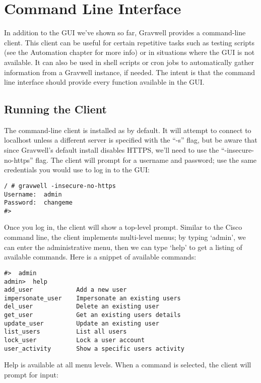 \chapter{Command Line Interface}
In addition to the GUI we've shown so far, Gravwell provides a
command-line client. This client can be useful for certain repetitive
tasks such as testing scripts (see the Automation chapter for more info)
or in situations where the GUI is not available. It can also be used in
shell scripts or cron jobs to automatically gather information from a
Gravwell instance, if needed. The intent is that the command line
interface should provide every function available in the GUI.

\section{Running the Client}

The command-line client is installed as  by
default. It will attempt to connect to localhost unless a different
server is specified with the ``-s'' flag, but be aware that since Gravwell's
default install disables HTTPS, we'll need to use the ``-insecure-no-https''
flag. The client will prompt for a username and password; use the same
credentials you would use to log in to the GUI:

\begin{Verbatim}[breaklines=true]
/ # gravwell -insecure-no-https
Username:  admin
Password:  changeme
#>
\end{Verbatim}

Once you log in, the client will show a top-level prompt. Similar to
the Cisco command line, the client implements multi-level menus; by
typing `admin', we can enter the administrative menu, then we can type
`help' to get a listing of available commands. Here is a snippet of
available commands:

\begin{Verbatim}[breaklines=true]
#>  admin
admin>  help
add_user            Add a new user
impersonate_user    Impersonate an existing users
del_user            Delete an existing user
get_user            Get an existing users details
update_user         Update an existing user
list_users          List all users
lock_user           Lock a user account
user_activity       Show a specific users activity
\end{Verbatim}

Help is available at all menu levels. When a command is selected,
the client will prompt for input:

